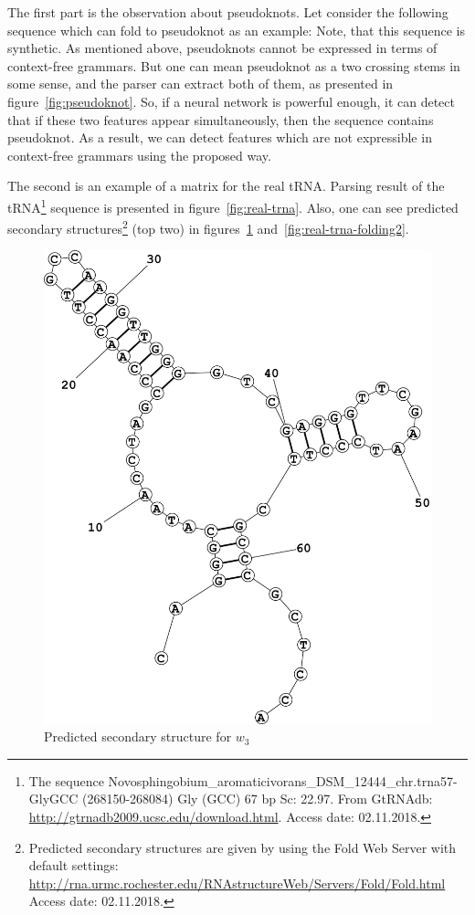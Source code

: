 \documentclass[a4paper,twoside]{article}
\begin{document}
The first part is the observation about pseudoknots. 
Let consider the following sequence which can fold to pseudoknot as an example: {}
Note, that this sequence is synthetic.
As mentioned above, pseudoknots cannot be expressed in terms of context-free grammars. 
But one can mean pseudoknot as a two crossing stems in some sense, and the parser can extract both of them, as presented in figure~\ref{fig:pseudoknot}.
So, if a neural network is powerful enough, it can detect that if these two features appear simultaneously, then the sequence contains pseudoknot.
As a result, we can detect features which are not expressible in context-free grammars using the proposed way.

The second is an example of a matrix for the real tRNA.
Parsing result of the tRNA\footnote{The sequence Novosphingobium\_aromaticivorans\_DSM\_12444\_chr.trna57-GlyGCC (268150-268084)  Gly (GCC) 67 bp Sc: 22.97. From GtRNAdb: \url{http://gtrnadb2009.ucsc.edu/download.html}. Access date: 02.11.2018.} sequence {} is presented in figure~\ref{fig:real-trna}. Also, one can see predicted secondary structures\footnote{Predicted secondary structures are given by using the Fold Web Server with default settings: \url{http://rna.urmc.rochester.edu/RNAstructureWeb/Servers/Fold/Fold.html} Access date: 02.11.2018.} (top two) in figures~\ref{fig:real-trna-folding1} and~\ref{fig:real-trna-folding2}.

\begin{figure}
\centering
\includegraphics[width=.45\textwidth]{figures/Fold1.pdf}
\caption{Predicted secondary structure for $w_3$}
\label{fig:real-trna-folding1}
\end{figure}
\end{document}
